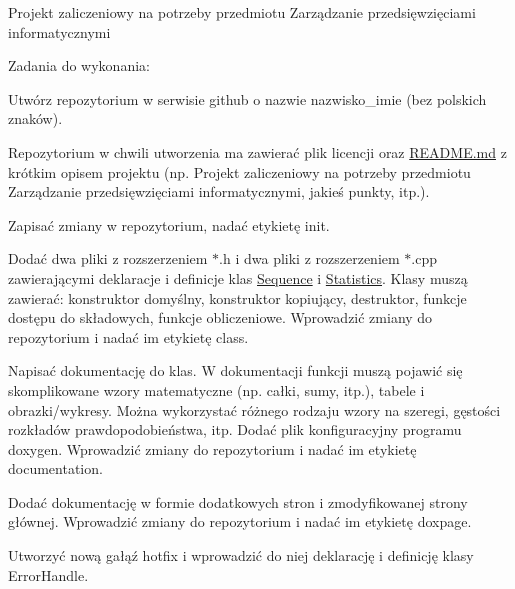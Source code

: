 Projekt zaliczeniowy na potrzeby przedmiotu Zarządzanie przedsięwzięciami informatycznymi

Zadania do wykonania\+:
\begin{DoxyEnumerate}
\item Utwórz repozytorium w serwisie github o nazwie \textquotesingle{}nazwisko\+\_\+imie\textquotesingle{} (bez polskich znaków).
\item Repozytorium w chwili utworzenia ma zawierać plik licencji oraz \mbox{\hyperlink{_r_e_a_d_m_e_8md}{README.\+md}} z krótkim opisem projektu (np. Projekt zaliczeniowy na potrzeby przedmiotu Zarządzanie przedsięwzięciami informatycznymi, jakieś punkty, itp.).
\item Zapisać zmiany w repozytorium, nadać etykietę \textquotesingle{}init\textquotesingle{}.
\item Dodać dwa pliki z rozszerzeniem $\ast$.h i dwa pliki z rozszerzeniem $\ast$.cpp zawierającymi deklaracje i definicje klas \textquotesingle{}\mbox{\hyperlink{class_sequence}{Sequence}}\textquotesingle{} i \textquotesingle{}\mbox{\hyperlink{class_statistics}{Statistics}}\textquotesingle{}. Klasy muszą zawierać\+: konstruktor domyślny, konstruktor kopiujący, destruktor, funkcje dostępu do składowych, funkcje obliczeniowe. Wprowadzić zmiany do repozytorium i nadać im etykietę \textquotesingle{}class\textquotesingle{}.
\item Napisać dokumentację do klas. W dokumentacji funkcji muszą pojawić się skomplikowane wzory matematyczne (np. całki, sumy, itp.), tabele i obrazki/wykresy. Można wykorzystać różnego rodzaju wzory na szeregi, gęstości rozkładów prawdopodobieństwa, itp. Dodać plik konfiguracyjny programu doxygen. Wprowadzić zmiany do repozytorium i nadać im etykietę \textquotesingle{}documentation\textquotesingle{}.
\item Dodać dokumentację w formie dodatkowych stron i zmodyfikowanej strony głównej. Wprowadzić zmiany do repozytorium i nadać im etykietę \textquotesingle{}doxpage\textquotesingle{}.
\item Utworzyć nową gałąź \textquotesingle{}hotfix\textquotesingle{} i wprowadzić do niej deklarację i definicję klasy \textquotesingle{}Error\+Handle\textquotesingle{}. 
\end{DoxyEnumerate}